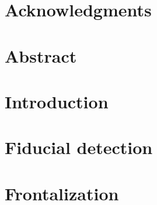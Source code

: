 \documentclass[11pt]{book}
\renewcommand{\baselinestretch}{1.2}
\begin{document}



\newpage
\thispagestyle{empty}
\renewcommand{\thesisdedication}{{\large Copyright \copyright~~Mallikarjun B R, 2016\\}{\large All Rights Reserved\\}}
\thesisdedicationpage



\newpage
\thispagestyle{empty}
\renewcommand{\thesisdedication}{\large To My Family}
\thesisdedicationpage

\mastersthesis
\renewcommand{\baselinestretch}{1.5}

\chapter*{Acknowledgments}
\label{ch:ack}


\chapter*{Abstract}
\label{ch:abstract}


\tableofcontents
\listoffigures
\listoftables

\chapter{Introduction}
\label{ch:intro}



\chapter{Fiducial detection}
\label{ch:fid_ch}



\chapter{Frontalization}
\label{ch:front_ch}


\end{document}

